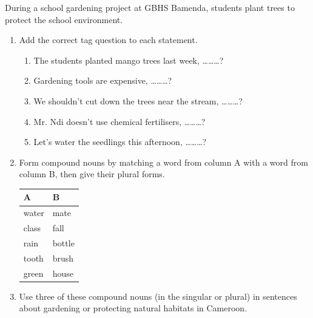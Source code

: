 \documentclass[11pt]{article}
\begin{document}
\begin{exercice}
During a school gardening project at GBHS Bamenda, students plant trees to protect the school environment.
\begin{enumerate}
\item Add the correct tag question to each statement.
\begin{enumerate}
\item The students planted mango trees last week, \ldots\ldots\ldots ?
\item Gardening tools are expensive, \ldots\ldots\ldots ?
\item We shouldn't cut down the trees near the stream, \ldots\ldots\ldots ?
\item Mr. Ndi doesn't use chemical fertilisers, \ldots\ldots\ldots ?
\item Let's water the seedlings this afternoon, \ldots\ldots\ldots ?
\end{enumerate}
\item Form compound nouns by matching a word from column A with a word from column B, then give their plural forms.

\begin{center}
\begin{tabular}{|l|l|}
\hline
\textbf{A} & \textbf{B} \\
\hline
water & mate \\
class & fall \\
rain & bottle \\
tooth & brush \\
green & house \\
\hline
\end{tabular}
\end{center}

\item Use three of these compound nouns (in the singular or plural) in sentences about gardening or protecting natural habitats in Cameroon.
\end{enumerate}
\end{exercice}
\end{document}
